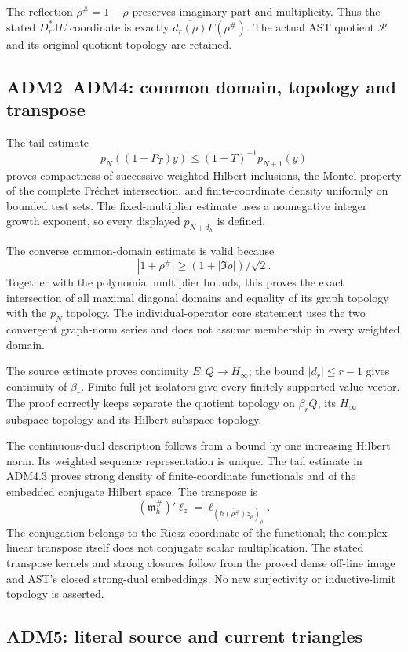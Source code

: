 The reflection \(\rho^\#=1-\overline\rho\) preserves imaginary part and
multiplicity. Thus the stated \(D_r^*\mathsf J E\) coordinate is exactly
\(\overline{d_r(\rho)}F(\rho^\#)\). The actual AST quotient
\(\mathcal R\) and its original quotient topology are retained.

\subsection{ADM2--ADM4: common domain, topology and
transpose}\label{adm2adm4-common-domain-topology-and-transpose}

The tail estimate \[
p_N((1-P_T)y)\le(1+T)^{-1}p_{N+1}(y)
\] proves compactness of successive weighted Hilbert inclusions, the
Montel property of the complete Fréchet intersection, and
finite-coordinate density uniformly on bounded test sets. The
fixed-multiplier estimate uses a nonnegative integer growth exponent, so
every displayed \(p_{N+d_h}\) is defined.

The converse common-domain estimate is valid because \[
|1+\rho^\#|\ge(1+|\Im\rho|)/\sqrt2.
\] Together with the polynomial multiplier bounds, this proves the exact
intersection of all maximal diagonal domains and equality of its graph
topology with the \(p_N\) topology. The individual-operator core
statement uses the two convergent graph-norm series and does not assume
membership in every weighted domain.

The source estimate proves continuity \(E:Q\to H_\infty\); the bound
\(|d_r|\le r-1\) gives continuity of \(\beta_r\). Finite full-jet
isolators give every finitely supported value vector. The proof
correctly keeps separate the quotient topology on \(\beta_rQ\), its
\(H_\infty\) subspace topology and its Hilbert subspace topology.

The continuous-dual description follows from a bound by one increasing
Hilbert norm. Its weighted sequence representation is unique. The tail
estimate in ADM4.3 proves strong density of finite-coordinate
functionals and of the embedded conjugate Hilbert space. The transpose
is \[
(\mathfrak m_h^\#)'\ell_z
=\ell_{(\overline{h(\rho^\#)}z_\rho)_\rho}.
\] The conjugation belongs to the Riesz coordinate of the functional;
the complex-linear transpose itself does not conjugate scalar
multiplication. The stated transpose kernels and strong closures follow
from the proved dense off-line image and AST's closed strong-dual
embeddings. No new surjectivity or inductive-limit topology is asserted.

\subsection{ADM5: literal source and current
triangles}\label{adm5-literal-source-and-current-triangles}


